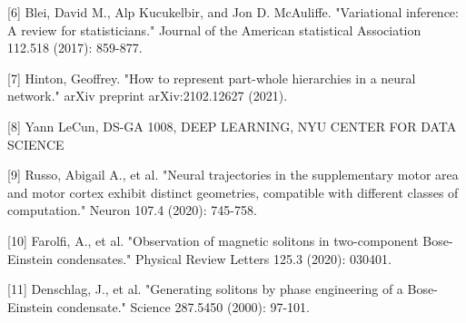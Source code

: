 \documentclass{article}
\begin{document}
[6] Blei, David M., Alp Kucukelbir, and Jon D. McAuliffe. "Variational inference: A review for statisticians." Journal of the American statistical Association 112.518 (2017): 859-877.


[7] Hinton, Geoffrey. "How to represent part-whole hierarchies in a neural network." arXiv preprint arXiv:2102.12627 (2021).

[8]  Yann LeCun, DS-GA 1008, DEEP LEARNING, NYU CENTER FOR DATA SCIENCE

[9] Russo, Abigail A., et al. "Neural trajectories in the supplementary motor area and motor cortex exhibit distinct geometries, compatible with different classes of computation." Neuron 107.4 (2020): 745-758.

[10] Farolfi, A., et al. "Observation of magnetic solitons in two-component Bose-Einstein condensates." Physical Review Letters 125.3 (2020): 030401.

[11] Denschlag, J., et al. "Generating solitons by phase engineering of a Bose-Einstein condensate." Science 287.5450 (2000): 97-101.



\end{document}

